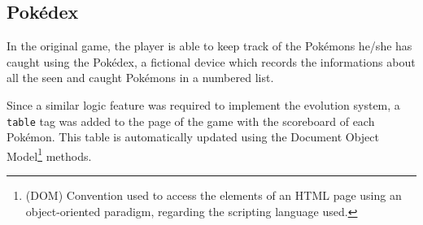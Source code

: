 \subsection{Pokédex}
\label{sec:pokedex}

In the original game, the player is able to keep track of the Pokémons he/she has caught using the Pokédex, a fictional device which records the informations about all the seen and caught Pokémons in a numbered list.

Since a similar logic feature was required to implement the evolution system, a \texttt{table} tag was added to the page of the game with the scoreboard of each Pokémon. This table is automatically updated using the Document Object Model\footnote{(DOM) Convention used to access the elements of an HTML page using an object-oriented paradigm, regarding the scripting language used.} methods.